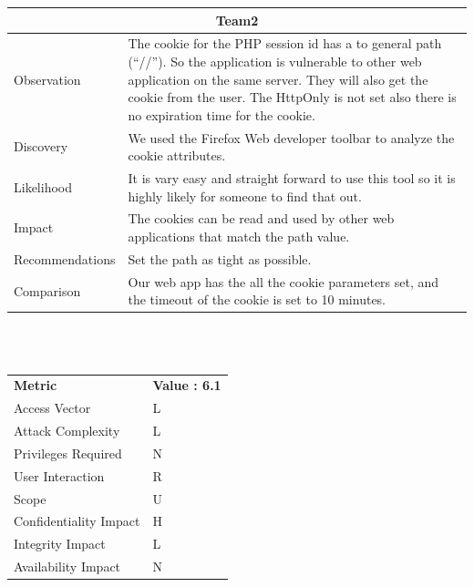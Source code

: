 \documentclass[headsepline,footsepline,footinclude=false,oneside,fontsize=11pt,paper=a4,listof=totoc,bibliography=totoc]{scrbook} %
\begin{document}
\begin{tabular}{ l|p{11cm}  }
	\hline
	\multicolumn{2}{c}{\textbf{Team2}} \\
	\hline
	Observation &  The cookie for the PHP session id has a to general path (``//''). So
	the application is vulnerable to other web application on the same server. They will
	also get the cookie from the user.  The HttpOnly is not set also there is no expiration time for the cookie.\\
	Discovery  & We used the Firefox Web developer toolbar to analyze the cookie attributes. \\
	Likelihood & It is vary easy and straight forward to use this tool so it is highly likely for someone to find that out.\\
	Impact    & The cookies can be read and used by other web applications that
	match the path value. \\
	Recommendations & Set the path as tight as possible. \\
	Comparison & Our web app has the all the cookie parameters set, and the timeout of the cookie is set to 10 minutes.\\
	\hline
\end{tabular}
\\
\vspace{0.5cm}
\\
\begin{center}
	\begin{tabular}{ll}
		\rowcolor[HTML]{34CDF9}
		{\color[HTML]{ECF4FF} \textbf{Metric}}        & {\color[HTML]{ECF4FF} \textbf{Value : 6.1}} \\
		\rowcolor[HTML]{BBDAFF}
		{\color[HTML]{333333} Access Vector}          & {\color[HTML]{333333} } L             \\
		\rowcolor[HTML]{ECF4FF}
		{\color[HTML]{333333} Attack Complexity}      & {\color[HTML]{333333} } L              \\
		\rowcolor[HTML]{BBDAFF}
		{\color[HTML]{333333} Privileges Required}    & {\color[HTML]{333333} } N              \\
		\rowcolor[HTML]{ECF4FF}
		{\color[HTML]{333333} User Interaction}       & {\color[HTML]{333333} } R              \\
		\rowcolor[HTML]{BBDAFF}
		{\color[HTML]{333333} Scope}                  & {\color[HTML]{333333} } U              \\
		\rowcolor[HTML]{ECF4FF}
		{\color[HTML]{333333} Confidentiality Impact} & {\color[HTML]{333333} } H              \\
		\rowcolor[HTML]{BBDAFF}
		{\color[HTML]{333333} Integrity Impact}       & {\color[HTML]{333333} } L              \\
		\rowcolor[HTML]{ECF4FF}
		{\color[HTML]{333333} Availability Impact}    & {\color[HTML]{333333} } N
	\end{tabular}
\end{center}
\end{document}
